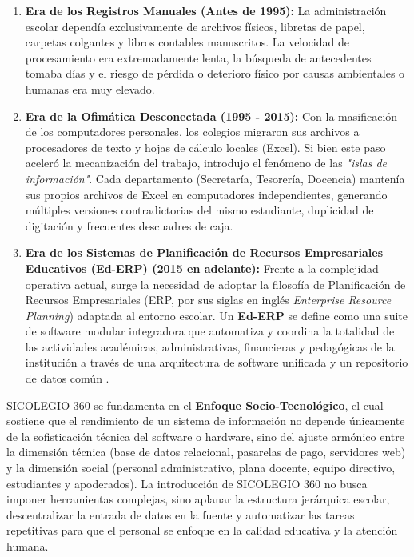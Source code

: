 \documentclass[12pt,a4paper,oneside]{report}
\begin{document}
\begin{enumerate}
    \item \textbf{Era de los Registros Manuales (Antes de 1995):} La administración escolar dependía exclusivamente de archivos físicos, libretas de papel, carpetas colgantes y libros contables manuscritos. La velocidad de procesamiento era extremadamente lenta, la búsqueda de antecedentes tomaba días y el riesgo de pérdida o deterioro físico por causas ambientales o humanas era muy elevado.
    \item \textbf{Era de la Ofimática Desconectada (1995 - 2015):} Con la masificación de los computadores personales, los colegios migraron sus archivos a procesadores de texto y hojas de cálculo locales (Excel). Si bien este paso aceleró la mecanización del trabajo, introdujo el fenómeno de las \textit{"islas de información"}. Cada departamento (Secretaría, Tesorería, Docencia) mantenía sus propios archivos de Excel en computadores independientes, generando múltiples versiones contradictorias del mismo estudiante, duplicidad de digitación y frecuentes descuadres de caja.
    \item \textbf{Era de los Sistemas de Planificación de Recursos Empresariales Educativos (Ed-ERP) (2015 en adelante):} Frente a la complejidad operativa actual, surge la necesidad de adoptar la filosofía de Planificación de Recursos Empresariales (ERP, por sus siglas en inglés \textit{Enterprise Resource Planning}) adaptada al entorno escolar. Un \textbf{Ed-ERP} se define como una suite de software modular integradora que automatiza y coordina la totalidad de las actividades académicas, administrativas, financieras y pedagógicas de la institución a través de una arquitectura de software unificada y un repositorio de datos común \citep{laudon2016}.
\end{enumerate}

SICOLEGIO 360 se fundamenta en el \textbf{Enfoque Socio-Tecnológico}, el cual sostiene que el rendimiento de un sistema de información no depende únicamente de la sofisticación técnica del software o hardware, sino del ajuste armónico entre la dimensión técnica (base de datos relacional, pasarelas de pago, servidores web) y la dimensión social (personal administrativo, plana docente, equipo directivo, estudiantes y apoderados). La introducción de SICOLEGIO 360 no busca imponer herramientas complejas, sino aplanar la estructura jerárquica escolar, descentralizar la entrada de datos en la fuente y automatizar las tareas repetitivas para que el personal se enfoque en la calidad educativa y la atención humana.
\end{document}
